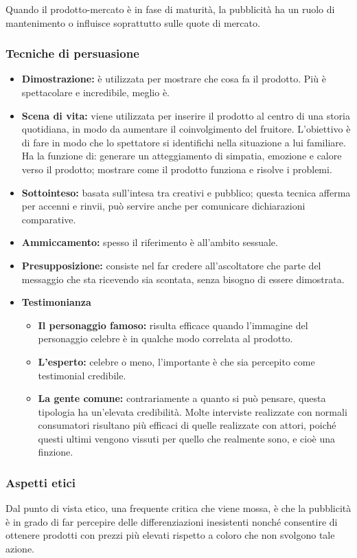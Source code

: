 Quando il prodotto-mercato è in fase di maturità, la pubblicità ha un ruolo di mantenimento o influisce soprattutto sulle quote di mercato.

\subsubsection{Tecniche di persuasione}
\begin{itemize}
	\item \textbf{Dimostrazione:} è utilizzata per mostrare che cosa fa il prodotto. Più è spettacolare e incredibile, meglio è.
	\item \textbf{Scena di vita:} viene utilizzata per inserire il prodotto al centro di una storia quotidiana, in modo da aumentare il coinvolgimento del fruitore. L’obiettivo è di fare in modo che lo spettatore si identifichi nella situazione a lui familiare. Ha la funzione di: generare un atteggiamento di simpatia, emozione e calore verso il prodotto; mostrare come il prodotto funziona e risolve i problemi.
	\item \textbf{Sottointeso:} basata sull'intesa tra creativi e pubblico; questa tecnica afferma per accenni e rinvii, può servire anche per comunicare dichiarazioni comparative.
	\item \textbf{Ammiccamento:} spesso il riferimento è all’ambito sessuale.
	\item \textbf{Presupposizione:} consiste nel far credere all'ascoltatore che parte del messaggio che sta ricevendo sia scontata, senza bisogno di essere dimostrata.
	\item \textbf{Testimonianza}
	\begin{itemize}
		\item \textbf{Il personaggio famoso:} risulta efficace quando l’immagine del personaggio celebre è in qualche modo correlata al prodotto.
		\item \textbf{L’esperto:} celebre o meno, l’importante è che sia percepito come testimonial credibile.
		\item \textbf{La gente comune:} contrariamente a quanto si può pensare, questa	tipologia ha un’elevata credibilità. Molte interviste realizzate con normali consumatori risultano più efficaci di quelle realizzate con	attori, poiché questi ultimi vengono vissuti per quello che realmente sono, e cioè una finzione.
	\end{itemize}		
\end{itemize}

\subsubsection{Aspetti etici}
Dal punto di vista etico, una frequente critica che viene mossa, è che la pubblicità è in grado di far percepire delle differenziazioni inesistenti nonché consentire di ottenere prodotti con prezzi più elevati rispetto a coloro che non svolgono tale azione.

